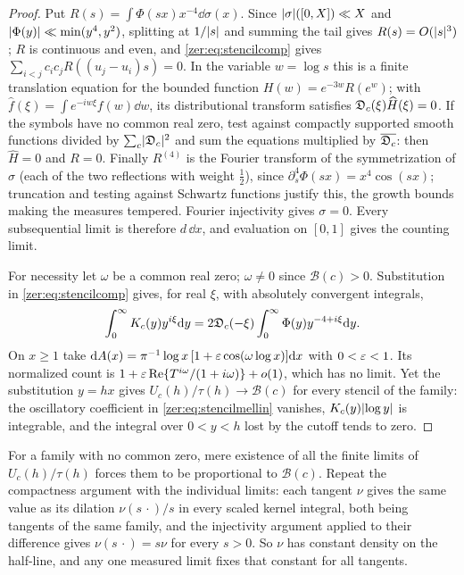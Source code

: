 \begin{proof}
Put $R(s)=\int\Phi(sx)x^{-4}\dd\sigma(x)$. Since $\lvert\sigma\rvert([0,X])\ll X$ and $\lvert\Phi(y)\rvert\ll\min(y^4,y^2)$,
splitting at $1/\lvert s\rvert$ and summing the tail gives $R(s)=O(\lvert s\rvert^3)$; $R$ is continuous and even, and
\eqref{zer:eq:stencilcomp} gives $\sum_{i<j}c_ic_jR((u_j-u_i)s)=0$. In the variable $w=\log s$ this is a
finite translation equation for the bounded function $H(w)=e^{-3w}R(e^w)$; with
$\widehat f(\xi)=\int e^{-iw\xi}f(w)\dd w$, its distributional transform satisfies
$\mathfrak{D}_c(\xi)\widehat H(\xi)=0$. If the symbols have no common real zero, test against compactly supported
smooth functions divided by $\sum_c\lvert\mathfrak{D}_c\rvert^2$ and sum the equations multiplied by
$\overline{\mathfrak{D}_c}$: then $\widehat H=0$ and $R=0$. Finally $R^{(4)}$ is the Fourier transform of the
symmetrization of $\sigma$ (each of the two reflections with weight $\tfrac12$), since
$\partial_s^4\Phi(sx)=x^4\cos(sx)$; truncation and testing against Schwartz functions justify this, the
growth bounds making the measures tempered. Fourier injectivity gives $\sigma=0$. Every subsequential
limit is therefore $d\,\dd x$, and evaluation on $[0,1]$ gives the counting limit.

For necessity let $\omega$ be a common real zero; $\omega\ne0$ since $\mathcal B(c)>0$. Substitution in
\eqref{zer:eq:stencilcomp} gives, for real $\xi$, with absolutely convergent integrals,
\begin{equation}\label{zer:eq:stencilmellin}
 \int_0^\infty K_c(y)y^{i\xi}\mathrm{d} y=2\mathfrak{D}_c(-\xi)\int_0^\infty\Phi(y)y^{-4+i\xi}\mathrm{d} y .
\end{equation}
On $x\ge1$ take $\mathrm{d} A(x)=\pi^{-1}\log x\,[1+\varepsilon\cos(\omega\log x)]\mathrm{d} x$ with $0<\varepsilon<1$. Its normalized
count is $1+\varepsilon\operatorname{Re}\{T^{i\omega}/(1+i\omega)\}+o(1)$, which has no limit. Yet the substitution $y=hx$ gives
$U_c(h)/\tau(h)\to\mathcal B(c)$ for every stencil of the family: the oscillatory coefficient in
\eqref{zer:eq:stencilmellin} vanishes, $K_c(y)\lvert\log y\rvert$ is integrable, and the integral over $0<y<h$ lost
by the cutoff tends to zero.
\end{proof}

\begin{remark}\label{zer:rem:stencilexist}
For a family with no common zero, mere existence of all the finite limits of $U_c(h)/\tau(h)$ forces
them to be proportional to $\mathcal B(c)$. Repeat the compactness argument with the individual limits:
each tangent $\nu$ gives the same value as its dilation $\nu(s\,\cdot)/s$ in every scaled kernel
integral, both being tangents of the same family, and the injectivity argument applied to their
difference gives $\nu(s\,\cdot)=s\nu$ for every $s>0$. So $\nu$ has constant density on the half-line,
and any one measured limit fixes that constant for all tangents.
\end{remark}

